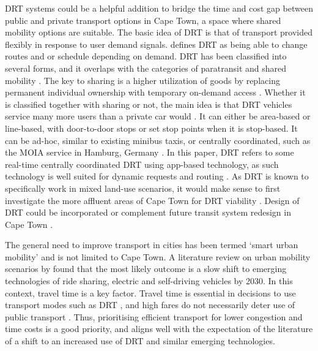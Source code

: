 \documentclass[main.tex]{subfiles}
\begin{document}
DRT systems could be a helpful addition to bridge the time and cost gap between public and private transport options in Cape Town, a space where shared mobility options are suitable. The basic idea of DRT is that of transport provided flexibly in response to user demand signals. \citealp{butler2020smart} defines DRT as being able to change routes and or schedule depending on demand. DRT has been classified into several forms, and it overlaps with the categories of paratransit and shared mobility \citep{butler2020smart}. The key to sharing is a higher utilization of goods by replacing permanent individual ownership with temporary on-demand access \citep{botsman2010s}. Whether it is classified together with sharing or not, the main idea is that DRT vehicles service many more users than a private car would \citep{munzel2018carsharing, butler2020smart}. It can either be area-based or line-based, with door-to-door stops \citep{vansteenwegen2022survey} or set stop points when it is stop-based. It can be ad-hoc, similar to existing minibus taxis, or centrally coordinated, such as the MOIA service in Hamburg, Germany \citep{KagerbauerKostorzWilkes2021_1000141282}. In this paper, DRT refers to some real-time centrally coordinated DRT using app-based technology, as such technology is well suited for dynamic requests and routing \citep{zwick2021ride}. As DRT is known to specifically work in mixed land-use scenarios, it would make sense to first investigate the more affluent areas of Cape Town for DRT viability \citep{yu2019exploring}. Design of DRT could be incorporated or complement future transit system redesign in Cape Town \citep{byala2021redesigning}.

The general need to improve transport in cities has been termed ‘smart urban mobility’\citep{butler2020smart} and is not limited to Cape Town. A literature review on urban mobility scenarios by \citealp{miskolczi2021urban} found that the most likely outcome is a slow shift to emerging technologies of ride sharing, electric and self-driving vehicles by 2030. In this context, travel time is a key factor. Travel time is essential in decisions to use transport modes such as DRT \citep{reck2020shared}, and high fares do not necessarily deter use of public transport \citep{tyrinopoulos2013factors}. Thus, prioritising efficient transport for lower congestion and time costs is a good priority, and aligns well with the expectation of the literature of a shift to an increased use of DRT and similar emerging technologies.
\end{document}
